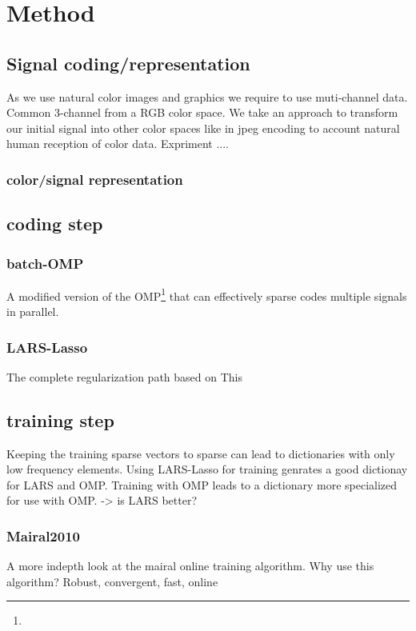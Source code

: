 \chapter{Method}


\section{Signal coding/representation}
As we use natural color images and graphics we require to use muti-channel data. Common 3-channel from a RGB color space.
We take an approach to transform our initial signal into other color spaces like in jpeg encoding to account natural human reception of
color data. 
Expriment ....
\subsection{color/signal representation}

\section{coding step}
\subsection{batch-OMP}
A modified version of the OMP\footnote{} that can effectively sparse codes multiple signals in parallel.

\subsection{LARS-Lasso}
The complete regularization path based on This \cite{lars.m}

\section{training step}
Keeping the training sparse vectors to sparse can lead to dictionaries with only low frequency elements.
Using LARS-Lasso for training genrates a good dictionay for LARS and OMP. Training with OMP leads to 
a dictionary more specialized for use with OMP. -> is LARS better?

\subsection{Mairal2010}
A more indepth look at the mairal online training algorithm. 
Why use this algorithm? Robust, convergent, fast, online

